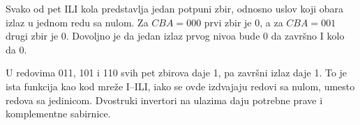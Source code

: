 
Svako od pet ILI kola predstavlja jedan potpuni zbir, odnosno uslov koji obara izlaz u jednom redu sa nulom. Za \(CBA=000\) prvi zbir je 0, a za \(CBA=001\) drugi zbir je 0. Dovoljno je da jedan izlaz prvog nivoa bude 0 da završno I kolo da 0.

U redovima 011, 101 i 110 svih pet zbirova daje 1, pa završni izlaz daje 1. To je ista funkcija kao kod mreže I–ILI, iako se ovde izdvajaju redovi sa nulom, umesto redova sa jedinicom. Dvostruki invertori na ulazima daju potrebne prave i komplementne sabirnice.
